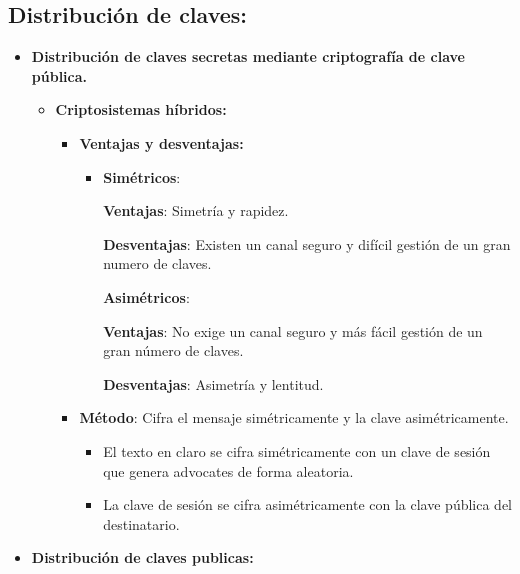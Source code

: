\documentclass[12pt, twoside, openright]{report} %
\begin{document}
  
  \subsection{Distribución de claves:}
  

  \begin{itemize}
  \item \textbf{Distribución de claves secretas mediante criptografía de
    clave pública.}
    

    \begin{itemize}
    \item \textbf{Criptosistemas híbridos:}
      

      \begin{itemize}
      \item \textbf{Ventajas y desventajas:}
        

        \begin{itemize}
        \item \textbf{Simétricos}:
          

          
		  
            \textbf{Ventajas}: Simetría y rapidez.
        
			
            \textbf{Desventajas}: Existen un canal seguro y difícil
            gestión de un gran numero de claves.
       
			
          \textbf{Asimétricos}:
        
		  
            \textbf{Ventajas}: No exige un canal seguro y más fácil
            gestión de un gran número de claves.
          
			
            \textbf{Desventajas}: Asimetría y lentitud.
           
			
        \end{itemize}
      \item \textbf{Método}: Cifra el mensaje simétricamente y la clave
        asimétricamente.
        

        \begin{itemize}
        \item El texto en claro se cifra simétricamente con un clave de
          sesión que genera advocates de forma aleatoria.
          
        \item La clave de sesión se cifra asimétricamente con la clave
          pública del destinatario.
          
        \end{itemize}
      \end{itemize}
    \end{itemize}
  \item \textbf{Distribución de claves publicas:}
    


\end{itemize}
\end{document}
